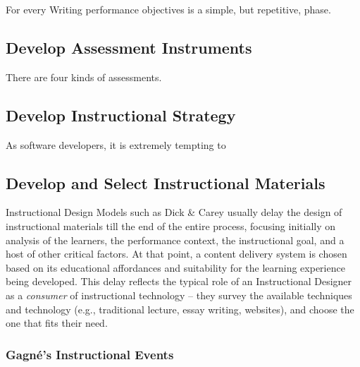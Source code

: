 \documentclass{sig-alternate}
\begin{document}
For every 
Writing performance objectives is a simple, but repetitive, phase.

\subsection{Develop Assessment Instruments}

There are four kinds of assessments.

\subsection{Develop Instructional Strategy}
As software developers, it is extremely tempting to 
\subsection{Develop and Select Instructional Materials}
Instructional Design Models such as Dick \& Carey usually delay the design of instructional materials till the end of the entire process, focusing initially on analysis of the learners, the performance context, the instructional goal, and a host of other critical factors. At that point, a content delivery system is chosen based on its educational affordances and suitability for the learning experience being developed. This delay reflects the typical role of an Instructional Designer as a \textit{consumer} of instructional technology -- they survey the available techniques and technology (e.g., traditional lecture, essay writing, websites), and choose the one that fits their need.

\subsubsection{Gagn\'{e}'s Instructional Events}
\end{document}
